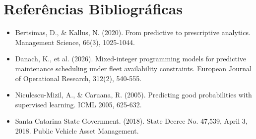 \documentclass[10pt,a4paper,journal]{article}
\begin{document}
\section{Referências Bibliográficas}
\begin{itemize}
\item Bertsimas, D., \& Kallus, N. (2020). From predictive to prescriptive analytics. Management Science, 66(3), 1025-1044.
\end{itemize}
\begin{itemize}
\item Danach, K., et al. (2026). Mixed-integer programming models for predictive maintenance scheduling under fleet availability constraints. European Journal of Operational Research, 312(2), 540-555.
\end{itemize}
\begin{itemize}
\item Niculescu-Mizil, A., \& Caruana, R. (2005). Predicting good probabilities with supervised learning. ICML 2005, 625-632.
\end{itemize}
\begin{itemize}
\item Santa Catarina State Government. (2018). State Decree No. 47,539, April 3, 2018. Public Vehicle Asset Management.
\end{itemize}
\end{document}
